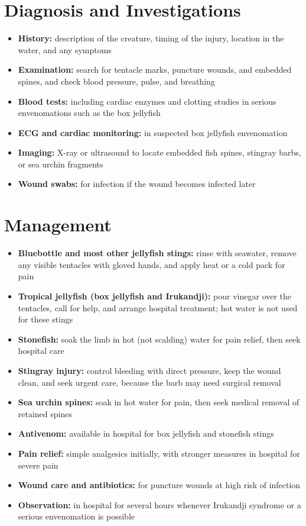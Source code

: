 \section*{Diagnosis and Investigations}
\begin{itemize}
    \item \textbf{History:} description of the creature, timing of the injury, location in the water, and any symptoms
    \item \textbf{Examination:} search for tentacle marks, puncture wounds, and embedded spines, and check blood pressure, pulse, and breathing
    \item \textbf{Blood tests:} including cardiac enzymes and clotting studies in serious envenomations such as the box jellyfish
    \item \textbf{ECG and cardiac monitoring:} in suspected box jellyfish envenomation
    \item \textbf{Imaging:} X-ray or ultrasound to locate embedded fish spines, stingray barbs, or sea urchin fragments
    \item \textbf{Wound swabs:} for infection if the wound becomes infected later
\end{itemize}

\section*{Management}
\begin{itemize}
    \item \textbf{Bluebottle and most other jellyfish stings:} rinse with seawater, remove any visible tentacles with gloved hands, and apply heat or a cold pack for pain
    \item \textbf{Tropical jellyfish (box jellyfish and Irukandji):} pour vinegar over the tentacles, call for help, and arrange hospital treatment; hot water is not used for these stings
    \item \textbf{Stonefish:} soak the limb in hot (not scalding) water for pain relief, then seek hospital care
    \item \textbf{Stingray injury:} control bleeding with direct pressure, keep the wound clean, and seek urgent care, because the barb may need surgical removal
    \item \textbf{Sea urchin spines:} soak in hot water for pain, then seek medical removal of retained spines
    \item \textbf{Antivenom:} available in hospital for box jellyfish and stonefish stings
    \item \textbf{Pain relief:} simple analgesics initially, with stronger measures in hospital for severe pain
    \item \textbf{Wound care and antibiotics:} for puncture wounds at high risk of infection
    \item \textbf{Observation:} in hospital for several hours whenever Irukandji syndrome or a serious envenomation is possible
\end{itemize}

